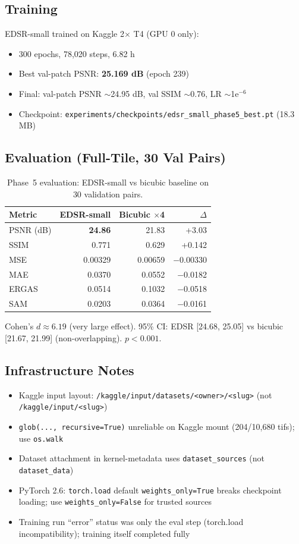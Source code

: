 \subsection{Training}
EDSR-small trained on Kaggle 2$\times$ T4 (GPU 0 only):
\begin{itemize}
    \item 300 epochs, 78,020 steps, 6.82 h
    \item Best val-patch PSNR: \textbf{25.169 dB} (epoch 239)
    \item Final: val-patch PSNR $\sim$24.95 dB, val SSIM $\sim$0.76, LR $\sim$1e$^{-6}$
    \item Checkpoint: \texttt{experiments/checkpoints/edsr\_small\_phase5\_best.pt} (18.3 MB)
\end{itemize}

\subsection{Evaluation (Full-Tile, 30 Val Pairs)}

\begin{table}[h]
\centering
\caption{Phase~5 evaluation: EDSR-small vs bicubic baseline on 30 validation pairs.}
\label{tab:eval}
\begin{tabular}{lrrr}
\toprule
Metric & EDSR-small & Bicubic $\times$4 & $\Delta$ \\
\midrule
PSNR (dB) & \textbf{24.86} & 21.83 & +3.03 \\
SSIM & 0.771 & 0.629 & +0.142 \\
MSE & 0.00329 & 0.00659 & $-$0.00330 \\
MAE & 0.0370 & 0.0552 & $-$0.0182 \\
ERGAS & 0.0514 & 0.1032 & $-$0.0518 \\
SAM & 0.0203 & 0.0364 & $-$0.0161 \\
\bottomrule
\end{tabular}
\end{table}

Cohen's $d \approx 6.19$ (very large effect). 95\% CI: EDSR [24.68, 25.05] vs bicubic [21.67, 21.99] (non-overlapping). $p < 0.001$.

\subsection{Infrastructure Notes}
\begin{itemize}
    \item Kaggle input layout: \texttt{/kaggle/input/datasets/<owner>/<slug>} (not \texttt{/kaggle/input/<slug>})
    \item \texttt{glob(..., recursive=True)} unreliable on Kaggle mount (204/10,680 tifs); use \texttt{os.walk}
    \item Dataset attachment in kernel-metadata uses \texttt{dataset\_sources} (not \texttt{dataset\_data})
    \item PyTorch 2.6: \texttt{torch.load} default \texttt{weights\_only=True} breaks checkpoint loading; use \texttt{weights\_only=False} for trusted sources
    \item Training run ``error'' status was only the eval step (torch.load incompatibility); training itself completed fully
\end{itemize}
